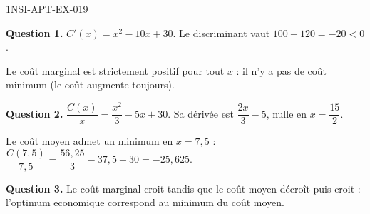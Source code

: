 \begin{corrige}{1NSI-APT-EX-019}

\textbf{Question 1.} $C'(x) = x^2 - 10x + 30$. Le discriminant vaut $100 - 120 = -20 < 0$.


Le coût marginal est strictement positif pour tout $x$ : il n'y a pas de coût minimum (le coût augmente toujours).

\textbf{Question 2.} $\dfrac{C(x)}{x} = \dfrac{x^2}{3} - 5x + 30$. Sa dérivée est $\dfrac{2x}{3} - 5$, nulle en $x = \dfrac{15}{2}$.

Le coût moyen admet un minimum en $x = 7{,}5$ : $\dfrac{C(7{,}5)}{7{,}5} = \dfrac{56{,}25}{3} - 37{,}5 + 30 = -25{,}625$.

\textbf{Question 3.} Le coût marginal croit tandis que le coût moyen décroît puis croit : l'optimum economique correspond au minimum du coût moyen.

\end{corrige}
